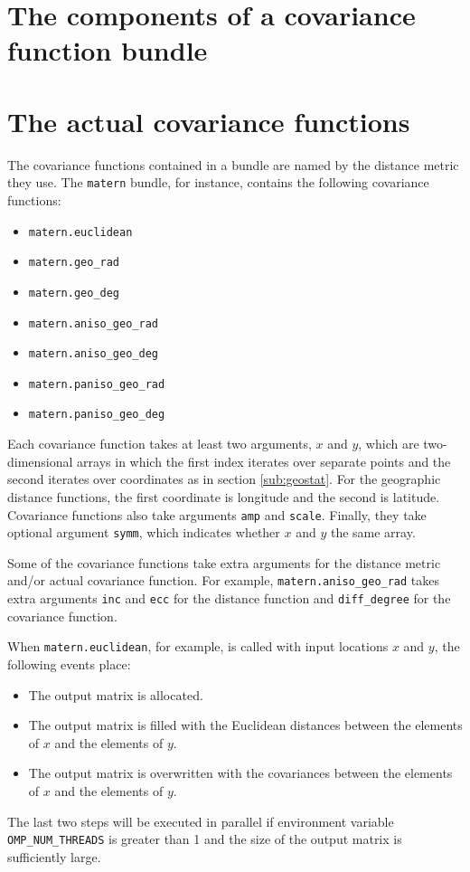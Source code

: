 \section{The components of a covariance function bundle}

\section{The actual covariance functions}\label{sub:distances}
The covariance functions contained in a bundle are named by the distance metric they use. The \texttt{matern} bundle, for instance, contains the following covariance functions:
\begin{itemize}
	\item \texttt{matern.euclidean}
	\item \texttt{matern.geo_rad}
	\item \texttt{matern.geo_deg}
	\item \texttt{matern.aniso_geo_rad}
	\item \texttt{matern.aniso_geo_deg}
	\item \texttt{matern.paniso_geo_rad}
	\item \texttt{matern.paniso_geo_deg}
\end{itemize}

Each covariance function takes at least two arguments, $x$ and $y$, which are two-dimensional arrays in which the first index iterates over separate points and the second iterates over coordinates as in section \ref{sub:geostat}. For the geographic distance functions, the first coordinate is longitude and the second is latitude. Covariance functions also take arguments \texttt{amp} and \texttt{scale}. Finally, they take optional argument \texttt{symm}, which indicates whether $x$ and $y$ the same array.

Some of the covariance functions take extra arguments for the distance metric and/or actual covariance function. For example, \texttt{matern.aniso_geo_rad} takes extra arguments \texttt{inc} and \texttt{ecc} for the distance function and \texttt{diff_degree} for the covariance function.

When \texttt{matern.euclidean}, for example, is called with input locations $x$ and $y$, the following events place:
\begin{itemize}
	\item The output matrix is allocated.
	\item The output matrix is filled with the Euclidean distances between the elements of $x$ and the elements of $y$.
	\item The output matrix is overwritten with the covariances between the elements of $x$ and the elements of $y$.
\end{itemize}
The last two steps will be executed in parallel if environment variable \texttt{OMP_NUM_THREADS} is greater than 1 and the size of the output matrix is sufficiently large.

